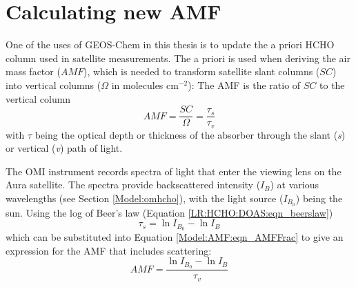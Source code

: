 \section{Calculating new AMF}
  \label{Model:AMF}
  
  One of the uses of GEOS-Chem in this thesis is to update the a priori HCHO column used in satellite measurements.
  The a priori is used when deriving the air mass factor ($AMF$), which is needed to transform satellite slant columns ($SC$) into vertical columns ($\Omega$ in molecules cm$^{-2}$):
  The AMF is the ratio of $SC$ to the vertical column
  \begin{equation} \label{Model:AMF:eqn_AMFFrac}
    AMF=\frac{SC}{\Omega} = \frac{\tau_s}{\tau_v}
  \end{equation}
  with $\tau$ being the optical depth or thickness of the absorber through the slant (\textit{s}) or vertical (\textit{v}) path of light.
  
  
  The OMI instrument records spectra of light that enter the viewing lens on the Aura satellite.
  The spectra provide backscattered intensity ($I_B$) at various wavelengths (see Section \ref{Model:omhcho}), with the light source ($I_{B_0}$) being the sun. 
  Using the log of Beer's law (Equation \ref{LR:HCHO:DOAS:eqn_beerslaw})  
  $$ \tau_s = \ln{I_{B_0}} - \ln{I_B} $$
  which can be substituted into Equation \ref{Model:AMF:eqn_AMFFrac} to give an expression for the AMF that includes scattering:
  \begin{equation} \label{Model:AMF:eqn_amfscattering}
    AMF = \frac{\ln{I_{B_0}}-\ln{I_B}}{\tau_v}
  \end{equation}
  
